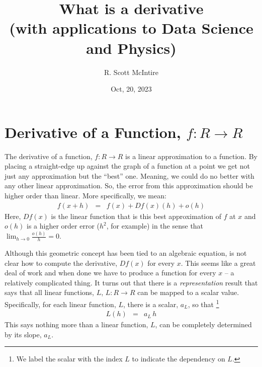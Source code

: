 \documentclass{article}
\title{What is a derivative \\ (with applications to Data Science and Physics)}
\author{R. Scott McIntire}
\date{Oct, 20, 2023}
\begin{document}
\maketitle

\section{Derivative of a Function, $f: R\rightarrow R$}
The derivative of a function, $f : R \rightarrow R$ is a linear approximation to
a function. By placing a straight-edge up against the graph of a function at
a point we get not just any approximation but the ``best''{} one. Meaning,
we could do no better with any other linear approximation. So, the error
from this approximation should be higher order than linear. More specifically,
we mean:
\begin{eqnarray}
f(x + h) & = & f(x) + Df(x)(h) + o(h) \label{simderdef}
\end{eqnarray}
Here, $Df(x)$ is the linear function that is this best approximation of $f$ at $x$
and $o(h)$ is a higher order error ($h^2$, for example) in the sense that
$\lim_{h\rightarrow 0} \frac{o(h)}{h} = 0$.

Although this geometric concept has been tied to an algebraic equation,
is not clear how to compute the derivative, $Df(x)$ for every $x$. This seems
like a great deal of work and when done we have to produce a function for
every $x$ -- a relatively complicated thing. It turns out that there is a
{\em representation\/} result	 that says that all linear functions, $L$,
$L: R \rightarrow R$ can be mapped to a scalar value.
Specifically, for each linear function, $L$, there is a scalar, $a_L$, so that%
\footnote{We label the scalar with the index $L$ to indicate the dependency on $L$.}
\begin{eqnarray}
  L(h) & = & a_L \, h
\end{eqnarray}
This says nothing more than a linear function, $L$, can be completely determined
by its slope, $a_L$.
\end{document}

